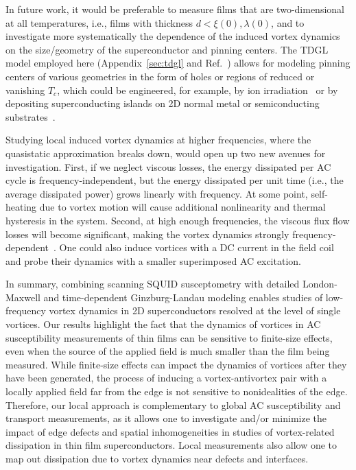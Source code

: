 \documentclass[%
 reprint,
 superscriptaddress,
 amsmath,
 amssymb,
 amsfonts,
 aps,
 prb,
]{revtex4-2}
\newcommand{\Tc}{T_c}
\begin{document}
In future work, it would be preferable to measure films that are two-dimensional at all temperatures, i.e., films with thickness $d<\xi(0),\lambda(0)$, and to investigate more systematically the dependence of the induced vortex dynamics on the size/geometry of the superconductor and pinning centers. The TDGL model employed here (Appendix~\ref{sec:tdgl} and Ref.~\cite{Bishop-Van_Horn2023-dm}) allows for modeling pinning centers of various geometries in the form of holes or regions of reduced or vanishing $\Tc$, which could be engineered, for example, by ion irradiation~\cite{Massee2015-el, Aichner2019-zq} or by depositing superconducting islands on 2D normal metal or semiconducting substrates~\cite{Resnick1981-ow, Eley2011-id, Bottcher2018-fx, Naibert2021-ps, Bishop-Van_Horn2022-lr, Al_Luhaibi2022-cl}.

Studying local induced vortex dynamics at higher frequencies, where the quasistatic approximation breaks down, would open up two new avenues for investigation. First, if we neglect viscous losses, the energy dissipated per AC cycle is frequency-independent, but the energy dissipated per unit time (i.e., the average dissipated power) grows linearly with frequency. At some point, self-heating due to vortex motion will cause additional nonlinearity and thermal hysteresis in the system. Second, at high enough frequencies, the viscous flux flow losses will become significant, making the vortex dynamics strongly frequency-dependent~\cite{Clem1991-vq}. One could also induce vortices with a DC current in the field coil and probe their dynamics with a smaller superimposed AC excitation.

In summary, combining scanning SQUID susceptometry with detailed London-Maxwell and time-dependent Ginzburg-Landau modeling enables studies of low-frequency vortex dynamics in 2D superconductors resolved at the level of single vortices. Our results highlight the fact that the dynamics of vortices in AC susceptibility measurements of thin films can be sensitive to finite-size effects, even when the source of the applied field is much smaller than the film being measured. While finite-size effects can impact the dynamics of vortices after they have been generated, the process of inducing a vortex-antivortex pair with a locally applied field far from the edge is not sensitive to nonidealities of the edge. Therefore, our local approach is complementary to global AC susceptibility and transport measurements, as it allows one to investigate and/or minimize the impact of edge defects and spatial inhomogeneities in studies of vortex-related dissipation in thin film superconductors. Local measurements also allow one to map out dissipation due to vortex dynamics near defects and interfaces.
\end{document}
